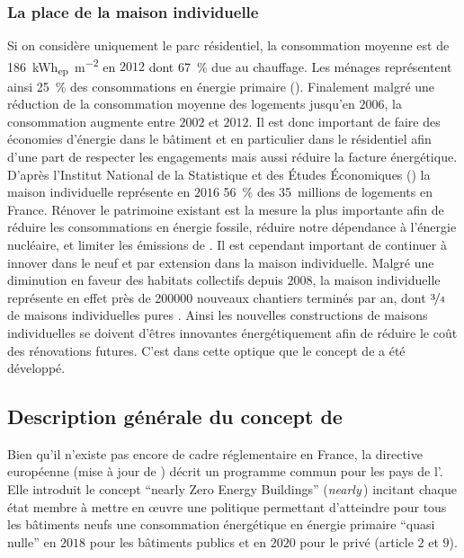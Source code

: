 \subsubsection{La place de la maison individuelle} %
\label{ssub:la_place_de_la_maison_individuelle}
Si on considère uniquement le parc résidentiel, la consommation moyenne
est de \SI{186}{\kWh_{ep}\per\metre\squared} en $2012$ dont \SI{67}{\percent} due
au chauffage. Les ménages représentent ainsi \SI{25}{\percent} des consommations
en énergie primaire (). Finalement malgré
une réduction de la consommation moyenne des logements jusqu’en $2006$, la
consommation augmente entre $2002$ et $2012$. Il est donc important
de faire des économies d’énergie dans le bâtiment et en particulier dans le résidentiel
afin d’une part de respecter les engagements mais aussi réduire la facture énergétique.
D’après l’Institut National de la Statistique et des Études Économiques ()
la maison individuelle représente en $2016$ \SI{56}{\percent} des \SI{35}{millions}
de logements en France.
Rénover le patrimoine existant est la mesure la plus importante afin de réduire
les consommations en énergie fossile, réduire notre dépendance à l’énergie nucléaire,
et limiter les émissions de . Il est cependant important de continuer à
innover dans le neuf et par extension dans la maison individuelle.
Malgré une diminution en faveur des habitats collectifs depuis $2008$, la maison individuelle
représente en effet près de \num{200000} nouveaux chantiers terminés par an, dont $\nicefrac{3}{4}$
de maisons individuelles pures \parencite{Caicedo2015}.
Ainsi les nouvelles constructions de maisons individuelles se doivent d’êtres innovantes
énergétiquement afin de réduire le coût des rénovations futures. C’est dans cette optique que le concept de  a été
développé.



\subsection{Description générale du concept de } %
\label{sub:description_generale_du_concept_de_bepos}
Bien qu’il n’existe pas encore de cadre réglementaire en France,
la directive européenne  \parencite{EPBD2010} (mise à jour de \textcite{EPBD2002})
décrit un programme commun pour les pays de l’.
Elle introduit le concept \enquote{nearly Zero Energy Buildings}
(\textit{nearly}\,) incitant chaque état membre à mettre en
œuvre une politique permettant d’atteindre pour tous les bâtiments neufs une consommation
énergétique en énergie primaire \enquote{quasi nulle} en $2018$ pour les bâtiments publics
et en $2020$ pour le privé (article $2$ et $9$).

